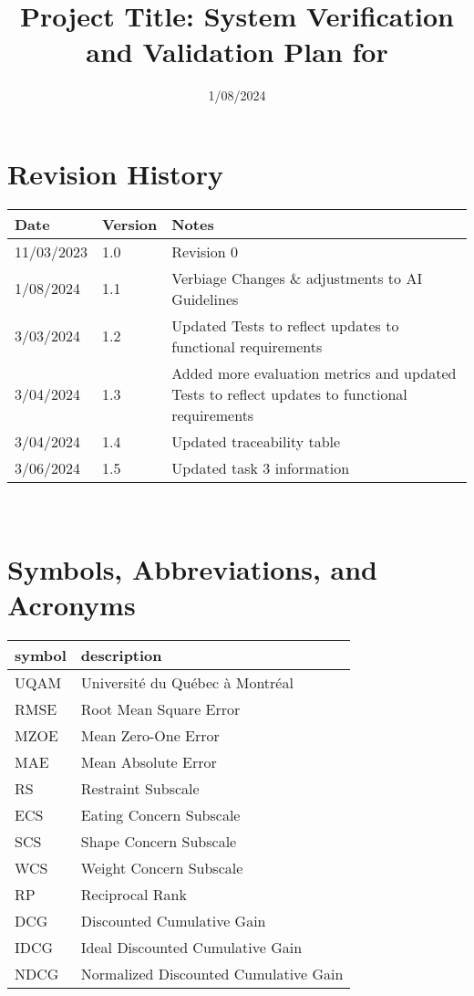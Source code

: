 \documentclass[12pt, titlepage]{article}
\begin{document}
\title{Project Title: System Verification and Validation Plan for \progname{}} 
\author{\authname}
\date{1/08/2024}
	
\maketitle


\section*{Revision History}

\begin{tabularx}{\textwidth}{p{3cm}p{2cm}X}
\toprule {\bf Date} & {\bf Version} & {\bf Notes}\\
\midrule
11/03/2023 & 1.0 & Revision 0\\
1/08/2024 & 1.1 & Verbiage Changes \& adjustments to AI Guidelines \\
3/03/2024 & 1.2 & Updated Tests to reflect updates to functional requirements \\
3/04/2024 & 1.3 & Added more evaluation metrics and updated Tests to reflect updates to functional requirements \\
3/04/2024 & 1.4 & Updated traceability table \\
3/06/2024 & 1.5 & Updated task 3 information \\
\bottomrule
\end{tabularx}

~\\

\newpage

\tableofcontents

\listoftables

\newpage

\section{Symbols, Abbreviations, and Acronyms}

\renewcommand{\arraystretch}{1.2}
\begin{tabular}{l l} 
  \toprule		
  \textbf{symbol} & \textbf{description}\\
  \midrule 
  UQAM & Université du Québec à Montréal\\
  RMSE & Root Mean Square Error\\
  MZOE & Mean Zero-One Error\\
  MAE & Mean Absolute Error\\
  RS & Restraint Subscale\\
  ECS & Eating Concern Subscale\\
  SCS & Shape Concern Subscale\\
  WCS & Weight Concern Subscale\\
  RP & Reciprocal Rank\\
  DCG & Discounted Cumulative Gain\\
  IDCG & Ideal Discounted Cumulative Gain\\
  NDCG & Normalized Discounted Cumulative Gain\\
  \bottomrule
\end{tabular}\\
\end{document}

